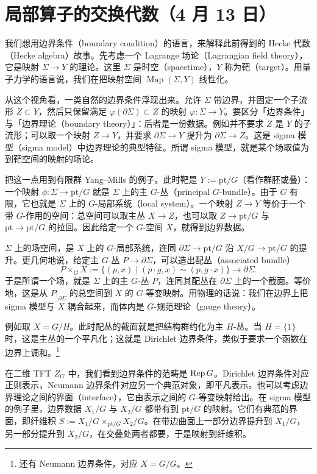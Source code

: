 \section[局部算子的交换代数]{局部算子的交换代数（4 月 13 日）}


我们想用边界条件（boundary condition）的语言，来解释此前得到的 Hecke 代数（Hecke algebra）故事。先考虑一个 Lagrange 场论（Lagrangian field theory），它是映射 $\Sigma\to Y$ 的理论。这里 $\Sigma$ 是时空（spacetime），$Y$ 称为靶（target）。用量子力学的语言说，我们在把映射空间 $\operatorname{Map}(\Sigma,Y)$ 线性化。

从这个视角看，一类自然的边界条件浮现出来。允许 $\Sigma$ 带边界，并固定一个子流形 $Z\subset Y$，然后只保留满足 $\varphi(\partial\Sigma)\subset Z$ 的映射 $\varphi:\Sigma\to Y$。要区分「边界条件」与「边界理论（boundary theory）」：后者是一份数据。例如并不要求 $Z$ 是 $Y$ 的子流形；可以取一个映射 $Z\to Y$，并要求 $\partial\Sigma\to Y$ 提升为 $\partial\Sigma\to Z$。这是 sigma 模型（sigma model）中边界理论的典型特征。所谓 sigma 模型，就是某个场取值为到靶空间的映射的场论。


把这一点用到有限群 Yang--Mills 的例子。此时靶是 $Y:=\mathrm{pt}/G$（看作群胚或叠）：一个映射 $\phi:\Sigma\to\mathrm{pt}/G$ 就是 $\Sigma$ 上的主 $G$-丛（principal $G$-bundle）。由于 $G$ 有限，它也就是 $\Sigma$ 上的 $G$-局部系统（local system）。一个映射 $Z\to Y$ 等价于一个带 $G$-作用的空间：总空间可以取主丛 $X\to Z$，也可以取 $Z\to\mathrm{pt}/G$ 与 $\mathrm{pt}\to\mathrm{pt}/G$ 的拉回。因此给定一个 $G$-空间 $X$，就得到边界数据。

$\Sigma$ 上的场空间，是 $X$ 上的 $G$-局部系统，连同 $\partial\Sigma\to\mathrm{pt}/G$ 沿 $X/G\to\mathrm{pt}/G$ 的提升。更几何地说，给定主 $G$-丛 $P\to\partial\Sigma$，可以造出配丛（associated bundle）
\[
P\times_G X:=\{(p,x)\mid (p\cdot g,x)\sim(p,g\cdot x)\}\longrightarrow\partial\Sigma .
\]
于是所谓一个场，就是 $\Sigma$ 上的主 $G$-丛 $P$，连同其配丛在 $\partial\Sigma$ 上的一个截面。等价地，这是从 $P|_{\partial\Sigma}$ 的总空间到 $X$ 的 $G$-等变映射。用物理的话说：我们在边界上把 sigma 模型与 $X$ 耦合起来，而体内是 $G$-规范理论（gauge theory）。

例如取 $X=G/H$。此时配丛的截面就是把结构群约化为主 $H$-丛。当 $H=\{1\}$ 时，这是主丛的一个平凡化；这就是 Dirichlet 边界条件，类似于要求一个函数在边界上调和。\footnote{还有 Neumann 边界条件，对应 $X=G/G$。}

在二维 TFT $Z_G$ 中，我们看到边界条件的范畴是 $\operatorname{Rep} G$。Dirichlet 边界条件对应正则表示，Neumann 边界条件对应另一个典范对象，即平凡表示。也可以考虑边界理论之间的界面（interface），它由表示之间的 $G$-等变映射给出。在 sigma 模型的例子里，边界数据 $X_1/G$ 与 $X_2/G$ 都带有到 $\mathrm{pt}/G$ 的映射。它们有典范的界面，即纤维积 $S:=X_1/G\times_{\mathrm{pt}/G}X_2/G$。在带边曲面上一部分边界提升到 $X_1/G$，另一部分提升到 $X_2/G$，在交叠处两者都要，于是映射到纤维积。

